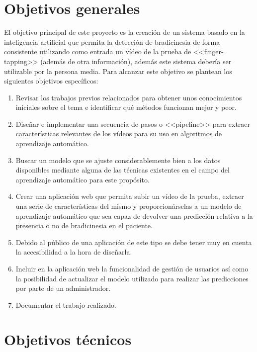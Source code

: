 \label{cha:Objetivos del proyecto}

\section{Objetivos generales}

El objetivo principal de este proyecto es la creación de un sistema basado en la
inteligencia artificial que permita la detección de bradicinesia de forma
consistente utilizando como entrada un vídeo de la prueba de <<finger-tapping>>
(además de otra información), además este sistema debería ser utilizable por la
persona media. Para alcanzar este objetivo se plantean los siguientes objetivos
específicos:

\begin{enumerate}
    \item Revisar los trabajos previos relacionados para obtener unos
    conocimientos iniciales sobre el tema e identificar qué métodos funcionan
    mejor y peor.
    \item Diseñar e implementar una secuencia de pasos o <<pipeline>> para
    extraer características relevantes de los vídeos para su uso en algoritmos
    de aprendizaje automático.
    \item Buscar un modelo que se ajuste considerablemente bien a los datos
    disponibles mediante alguna de las técnicas existentes en el campo del
    aprendizaje automático para este propósito.
    \item Crear una aplicación web que permita subir un vídeo de la prueba,
    extraer una serie de características del mismo y proporcionárselas a un
    modelo de aprendizaje automático que sea capaz de devolver una predicción
    relativa a la presencia o no de bradicinesia en el paciente.
    \item Debido al público de una aplicación de este tipo se debe tener muy en
    cuenta la accesibilidad a la hora de diseñarla.
    \item Incluir en la aplicación web la funcionalidad de gestión de usuarios
    así como la posibilidad de actualizar el modelo utilizado para realizar las
    predicciones por parte de un administrador.
    \item Documentar el trabajo realizado.
\end{enumerate}

\section{Objetivos técnicos}

